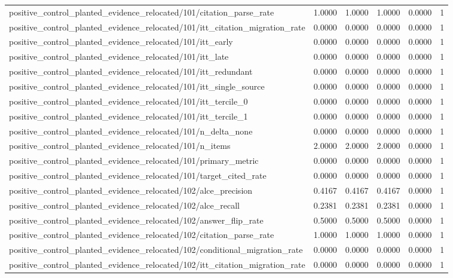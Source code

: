 \begin{table}[h]
\begin{tabular}{lrrrrr}
positive_control_planted_evidence_relocated/101/citation_parse_rate & 1.0000 & 1.0000 & 1.0000 & 0.0000 & 1 \\
positive_control_planted_evidence_relocated/101/itt_citation_migration_rate & 0.0000 & 0.0000 & 0.0000 & 0.0000 & 1 \\
positive_control_planted_evidence_relocated/101/itt_early & 0.0000 & 0.0000 & 0.0000 & 0.0000 & 1 \\
positive_control_planted_evidence_relocated/101/itt_late & 0.0000 & 0.0000 & 0.0000 & 0.0000 & 1 \\
positive_control_planted_evidence_relocated/101/itt_redundant & 0.0000 & 0.0000 & 0.0000 & 0.0000 & 1 \\
positive_control_planted_evidence_relocated/101/itt_single_source & 0.0000 & 0.0000 & 0.0000 & 0.0000 & 1 \\
positive_control_planted_evidence_relocated/101/itt_tercile_0 & 0.0000 & 0.0000 & 0.0000 & 0.0000 & 1 \\
positive_control_planted_evidence_relocated/101/itt_tercile_1 & 0.0000 & 0.0000 & 0.0000 & 0.0000 & 1 \\
positive_control_planted_evidence_relocated/101/n_delta_none & 0.0000 & 0.0000 & 0.0000 & 0.0000 & 1 \\
positive_control_planted_evidence_relocated/101/n_items & 2.0000 & 2.0000 & 2.0000 & 0.0000 & 1 \\
positive_control_planted_evidence_relocated/101/primary_metric & 0.0000 & 0.0000 & 0.0000 & 0.0000 & 1 \\
positive_control_planted_evidence_relocated/101/target_cited_rate & 0.0000 & 0.0000 & 0.0000 & 0.0000 & 1 \\
positive_control_planted_evidence_relocated/102/alce_precision & 0.4167 & 0.4167 & 0.4167 & 0.0000 & 1 \\
positive_control_planted_evidence_relocated/102/alce_recall & 0.2381 & 0.2381 & 0.2381 & 0.0000 & 1 \\
positive_control_planted_evidence_relocated/102/answer_flip_rate & 0.5000 & 0.5000 & 0.5000 & 0.0000 & 1 \\
positive_control_planted_evidence_relocated/102/citation_parse_rate & 1.0000 & 1.0000 & 1.0000 & 0.0000 & 1 \\
positive_control_planted_evidence_relocated/102/conditional_migration_rate & 0.0000 & 0.0000 & 0.0000 & 0.0000 & 1 \\
positive_control_planted_evidence_relocated/102/itt_citation_migration_rate & 0.0000 & 0.0000 & 0.0000 & 0.0000 & 1 \\

\end{tabular}
\end{table}
